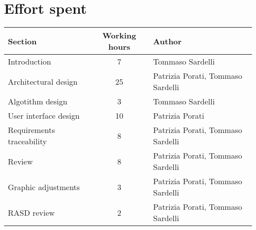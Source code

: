 \pagebreak

\section{Effort spent}

\begin{center}
	\vspace{0.1cm}
	\begin{tabular}{ l c l } 
		\hline
		Section 					& Working hours 	& Author \\ 
		\hline
		Introduction				& 7 				& Tommaso Sardelli	\\
		Architectural design		& 25 				& Patrizia Porati, Tommaso Sardelli	\\
		Algotithm design	 		& 3				 	& Tommaso Sardelli \\ 
		User interface design		& 10 				& Patrizia Porati	\\
		Requirements traceability	& 8 				& Patrizia Porati, Tommaso Sardelli	\\
		Review						& 8					& Patrizia Porati, Tommaso Sardelli \\
		Graphic adjustments			& 3 				& Patrizia Porati, Tommaso Sardelli \\
		RASD review					& 2 				& Patrizia Porati, Tommaso Sardelli \\
		\hline
	\end{tabular}
	\vspace{0.4cm}
\end{center}
